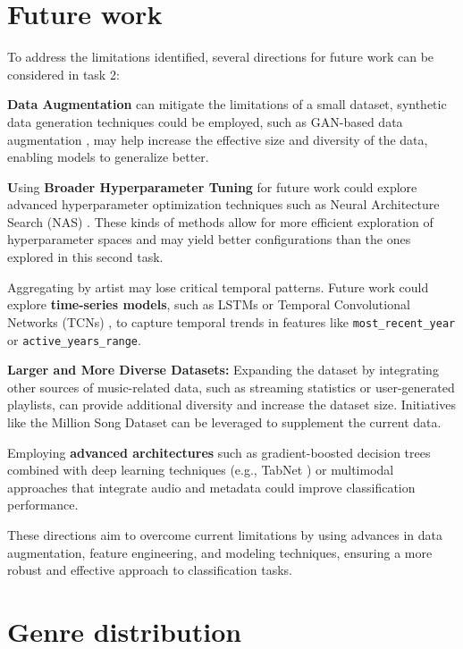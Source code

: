 \documentclass{article}
\begin{document}
\section{Future work}
\label{appendix:future_work}

To address the limitations identified, several directions for future work can be considered in task 2:


\textbf{Data Augmentation} can mitigate the limitations of a small dataset, synthetic data generation techniques could be employed, such as GAN-based data augmentation \cite{antoniou2017data}, may help increase the effective size and diversity of the data, enabling models to generalize better.

\textbf Using \textbf{Broader Hyperparameter Tuning} for future work could explore advanced hyperparameter optimization techniques such as Neural Architecture Search (NAS) \cite{zoph2016neural}. These kinds of methods allow for more efficient exploration of hyperparameter spaces and may yield better configurations than the ones explored in this second task.

Aggregating by artist may lose critical temporal patterns. Future work could explore \textbf{time-series models}, such as LSTMs \cite{hochreiter1997long} or Temporal Convolutional Networks (TCNs) \cite{lea2017temporal}, to capture temporal trends in features like \texttt{most\_recent\_year} or \texttt{active\_years\_range}.

\textbf{Larger and More Diverse Datasets:} Expanding the dataset by integrating other sources of music-related data, such as streaming statistics or user-generated playlists, can provide additional diversity and increase the dataset size. Initiatives like the Million Song Dataset \cite{bertin2011million} can be leveraged to supplement the current data.

Employing \textbf{advanced architectures} such as gradient-boosted decision trees combined with deep learning techniques (e.g., TabNet \cite{arik2021tabnet}) or multimodal approaches that integrate audio and metadata \cite{choi2017convolutional} could improve classification performance.

These directions aim to overcome current limitations by using advances in data augmentation, feature engineering, and modeling techniques, ensuring a more robust and effective approach to classification tasks.

\newpage
\section{Genre distribution}
\end{document}
